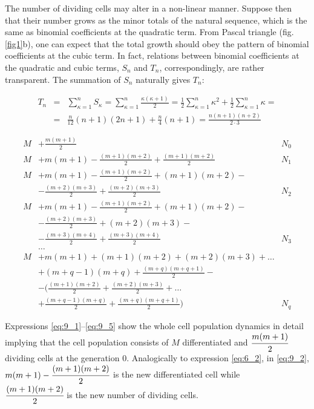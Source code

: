 \documentclass[12pt, twoside, leqno]{article}
\theoremstyle{definition}
\numberwithin{equation}{section}
\begin{document}
The number of dividing cells may alter in a non-linear manner. Suppose then that their number grows as the minor totals of the natural sequence, which is the same as binomial coefficients at the quadratic term. From Pascal triangle (fig. \ref{fig1}b), one can expect that the total growth should obey the pattern of binomial coefficients at the cubic term. In fact, relations between binomial coefficients at the quadratic and cubic terms, $S_n$ and $T_n$, correspondingly, are rather transparent. The summation of $S_n$ naturally gives $T_n$:

\begin{eqnarray}
T_n &=& \sum_{\kappa =1}^n S_{\kappa} = \sum_{\kappa =1}^n \frac{\kappa (\kappa +1)}{2} = \frac{1}{2}\sum_{\kappa =1}^n \kappa ^2 + \frac{1}{2}\sum_{\kappa =1}^n \kappa = \label{eq:8} \\
&=& \frac{n}{12}(n + 1)(2n + 1) + \frac{n}{4}(n + 1) = \frac{n(n + 1)(n + 2)}{2\cdot 3}\nonumber
\end{eqnarray}

\begin{align}
M &+ \frac{m(m + 1)}{2} &N_0\label{eq:9_1} \\
M &+ m(m + 1) - \frac{(m + 1)(m + 2)}{2} + \frac{(m + 1)(m + 2)}{2} &N_1 \label{eq:9_2} \\
M &+ m(m + 1) - \frac{(m + 1)(m + 2)}{2} + (m + 1)(m + 2) - & \label{eq:9_3} \\
& - \frac{(m + 2)(m + 3)}{2} + \frac{(m + 2)(m + 3)}{2} &N_2 \nonumber \\
M &+ m(m + 1) - \frac{(m + 1)(m + 2)}{2} + (m + 1)(m + 2) - & \label{eq:9_4} \\
& - \frac{(m + 2)(m + 3)}{2} + (m + 2)(m + 3) - \nonumber \\
& - \frac{(m + 3)(m + 4)}{2} + \frac{(m + 3)(m + 4)}{2} &N_3 \nonumber \\
&\dots & \nonumber \\
M &+ m(m + 1) + (m + 1)(m + 2) + (m + 2)(m + 3) + \dots &\label{eq:9_5}\\
& + (m + q - 1)(m + q) + \frac{(m + q)(m + q + 1)}{2} - & \nonumber \\
& - \bigg(\frac{(m + 1)(m + 2)}{2} + \frac{(m + 2)(m + 3)}{2} + \dots &\nonumber \\
& + \frac{(m + q - 1)(m + q)}{2} + \frac{(m + q)(m + q + 1)}{2}\bigg) &N_q \nonumber
\end{align}

Expressions \ref{eq:9_1}--\ref{eq:9_5} show the whole cell population dynamics in detail implying that the cell population consists of $M$ differentiated and $\cfrac{m(m + 1)}{2}$ dividing cells at the generation $0$. Analogically to expression \ref{eq:6_2}, in \ref{eq:9_2}, $m(m + 1) - \cfrac{(m + 1)(m + 2)}{2}$ is the new differentiated cell while \\ $\cfrac{(m + 1)(m + 2)}{2}$ is the new number of dividing cells.
\end{document}
